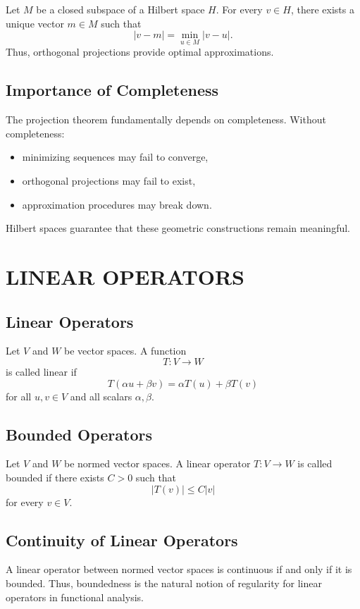\documentclass[aps,prl,twocolumn,groupedaddress]{revtex4-2}
\begin{document}
Let $M$ be a closed subspace of a Hilbert space $H$.
For every $v\in H$, there exists a unique vector $m\in M$ such that
$$
|v-m|
=
\min_{u\in M}|v-u|.
$$
Thus, orthogonal projections provide optimal approximations.

\subsection{Importance of Completeness}

The projection theorem fundamentally depends on completeness.
Without completeness:
\begin{itemize}
\item minimizing sequences may fail to converge,
\item orthogonal projections may fail to exist,
\item approximation procedures may break down.
\end{itemize}
Hilbert spaces guarantee that these geometric constructions remain meaningful.

\section{LINEAR OPERATORS}

\subsection{Linear Operators}

Let $V$ and $W$ be vector spaces.
A function
$$
T:V\to W
$$
is called linear if
$$
T(\alpha u+\beta v)
=
\alpha T(u)+\beta T(v)
$$
for all $u,v\in V$ and all scalars $\alpha,\beta$.

\subsection{Bounded Operators}

Let $V$ and $W$ be normed vector spaces.
A linear operator $T:V\to W$ is called bounded if there exists $C>0$ such that
$$
|T(v)|
\leq
C|v|
$$
for every $v\in V$.

\subsection{Continuity of Linear Operators}

A linear operator between normed vector spaces is continuous if and only if it is bounded.
Thus, boundedness is the natural notion of regularity for linear operators in functional analysis.
\end{document}
